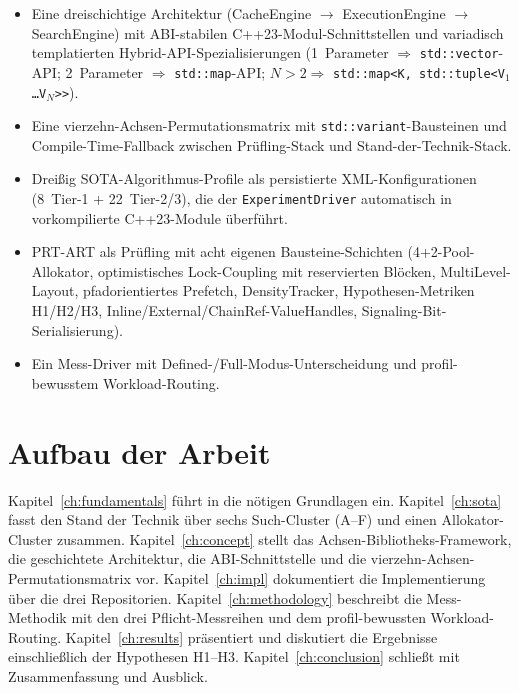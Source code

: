 \begin{itemize}
  \item Eine dreischichtige Architektur (CacheEngine $\to$ ExecutionEngine $\to$
        SearchEngine) mit ABI-stabilen C++23-Modul-Schnittstellen und variadisch
        templatierten Hybrid-API-Spezialisierungen (1~Parameter $\Rightarrow$
        \texttt{std::vector}-API; 2~Parameter $\Rightarrow$ \texttt{std::map}-API; $N>2
        \Rightarrow$ \texttt{std::map<K,\,std::tuple<V$_1$\ldots V$_N$>>}).
  \item Eine vierzehn-Achsen-Permutationsmatrix mit \texttt{std::variant}-Bausteinen und
        Compile-Time-Fallback zwischen Prüfling-Stack und Stand-der-Technik-Stack.
  \item Dreißig SOTA-Algorithmus-Profile als persistierte XML-Konfigurationen (8~Tier-1 +
        22~Tier-2/3), die der \texttt{ExperimentDriver} automatisch in vorkompilierte
        C++23-Module überführt.
  \item PRT-ART als Prüfling mit acht eigenen Bausteine-Schichten (4+2-Pool-Allokator,
        optimistisches Lock-Coupling mit reservierten Blöcken, MultiLevel-Layout,
        pfadorientiertes Prefetch, DensityTracker, Hypothesen-Metriken H1/H2/H3,
        Inline/External/ChainRef-ValueHandles, Signaling-Bit-Serialisierung).
  \item Ein Mess-Driver mit Defined-/Full-Modus-Unterscheidung und profil-bewusstem
        Workload-Routing.
\end{itemize}

\section{Aufbau der Arbeit}\label{sec:structure}

Kapitel~\ref{ch:fundamentals} führt in die nötigen Grundlagen ein.
Kapitel~\ref{ch:sota} fasst den Stand der Technik über sechs Such-Cluster (A--F) und einen
Allokator-Cluster zusammen. Kapitel~\ref{ch:concept} stellt das Achsen-Bibliotheks-Framework,
die geschichtete Architektur, die ABI-Schnittstelle und die vierzehn-Achsen-Permutationsmatrix
vor. Kapitel~\ref{ch:impl} dokumentiert die Implementierung über die drei Repositorien.
Kapitel~\ref{ch:methodology} beschreibt die Mess-Methodik mit den drei Pflicht-Messreihen und
dem profil-bewussten Workload-Routing. Kapitel~\ref{ch:results} präsentiert und diskutiert die
Ergebnisse einschließlich der Hypothesen H1--H3. Kapitel~\ref{ch:conclusion} schließt mit
Zusammenfassung und Ausblick.

